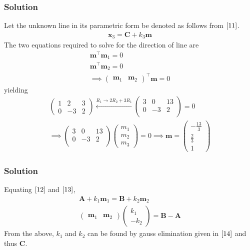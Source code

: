 \documentclass{beamer}
\theoremstyle{remark}
\newcommand{\myvec}[1]{\ensuremath{\begin{pmatrix}#1\end{pmatrix}}}
\let\vec\mathbf
\begin{document}
\begin{frame}
\frametitle{Solution}
Let the unknown line in its parametric form be denoted as follows from $\eqref{11}$.
\begin{align}
    \vec{x}_3 = \vec{C} + k_3\vec{m}
\end{align}
The two equations required to solve for the direction of line are 
\begin{align}
\vec{m}^\top\vec{m}_1 = 0\\
\vec{m}^\top\vec{m}_2 = 0\\
	\implies \myvec{\vec{m}_1 &\vec{m}_2}^{\top}\vec{m} = 0
\end{align}
yielding
\begin{align}
    \myvec{
        1 & 2 & 3\\
        0 & -3 & 2   
    } \xleftarrow{R_1 \to 2R_2 + 3R_1} \myvec{
        3 & 0 & 13\\
        0 & -3 & 2   \\
    } = 0\\
  \implies  \myvec{
        3 & 0 & 13\\
        0 & -3 & 2   \\
    }\myvec{
        m_1\\
        m_2\\
        m_3
    } = 0
    \implies \vec{m} = \myvec{
	    -\frac{13}{3}\\[1ex]
        \frac{2}{3}\\[1ex]
        1
    }
\end{align}
\end{frame}
%
\begin{frame}
\frametitle{Solution}
Equating $\eqref{12}$ and $\eqref{13}$,
\begin{align}
    \vec{A} + k_1\vec{m}_1 = \vec{B} + k_2\vec{m}_2\\
    \myvec{
        \vec{m}_1 & \vec{m}_2
    }\myvec{
        k_1 \\
        -k_2
    } = \vec{B}-\vec{A}
	\label{eq:non-skew}
\end{align}
From the above, $k_1$ and $k_2$ can be found by gauss elimination given in $\eqref{14}$ and thus $\vec{C}$.

\end{frame}
\end{document}
